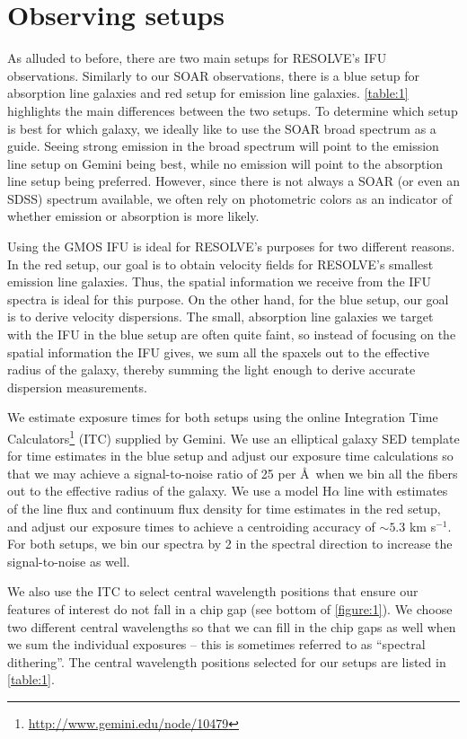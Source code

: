 \documentclass[12pt]{report}
\begin{document}
\section{Observing setups}
\label{setups}
As alluded to before, there are two main setups for RESOLVE's IFU observations. Similarly to our SOAR observations, there is a blue setup for absorption line galaxies and red setup for emission line galaxies. \autoref{table:1} highlights the main differences between the two setups. To determine which setup is best for which galaxy, we ideally like to use the SOAR broad spectrum as a guide. Seeing strong emission in the broad spectrum will point to the emission line setup on Gemini being best, while no emission will point to the absorption line setup being preferred. However, since there is not always a SOAR (or even an SDSS) spectrum available, we often rely on photometric colors as an indicator of whether emission or absorption is more likely.

Using the GMOS IFU is ideal for RESOLVE's purposes for two different reasons. In the red setup, our goal is to obtain velocity fields for RESOLVE's smallest emission line galaxies. Thus, the spatial information we receive from the IFU spectra is ideal for this purpose. On the other hand, for the blue setup, our goal is to derive velocity dispersions. The small, absorption line galaxies we target with the IFU in the blue setup are often quite faint, so instead of focusing on the spatial information the IFU gives, we sum all the spaxels out to the effective radius of the galaxy, thereby summing the light enough to derive accurate dispersion measurements. 

We estimate exposure times for both setups using the online Integration Time Calculators\footnote{\url{http://www.gemini.edu/node/10479}} (ITC) supplied by Gemini. We use an elliptical galaxy SED template for time estimates in the blue setup and adjust our exposure time calculations so that we may achieve a signal-to-noise ratio of 25 per \AA\ when we bin all the fibers out to the effective radius of the galaxy. We use a model H$\alpha$ line with estimates of the line flux and continuum flux density for time estimates in the red setup, and adjust our exposure times to achieve a centroiding accuracy of $\sim5.3$ km s$^{-1}$. For both setups, we bin our spectra by 2 in the spectral direction to increase the signal-to-noise as well.

We also use the ITC to select central wavelength positions that ensure our features of interest do not fall in a chip gap (see bottom of \autoref{figure:1}). We choose two different central wavelengths so that we can fill in the chip gaps as well when we sum the individual exposures -- this is sometimes referred to as ``spectral dithering''. The central wavelength positions selected for our setups are listed in \autoref{table:1}.
\end{document}
